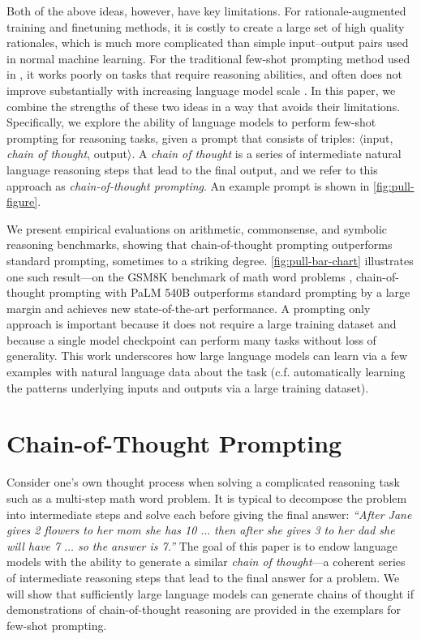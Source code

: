 Both of the above ideas, however, have key limitations. For rationale-augmented training and finetuning methods, it is costly to create a large set of high quality rationales, which is much more complicated than simple input--output pairs used in normal machine learning. For the traditional few-shot prompting method used in \citet{brown2020language}, it works poorly on tasks that require reasoning abilities, and often does not improve substantially with increasing language model scale \citep{rae2021scaling}. In this paper, we combine the strengths of these two ideas in a way that avoids their limitations. Specifically, we explore the ability of language models to perform few-shot prompting for reasoning tasks, given a prompt that consists of triples: $\langle$input, \emph{chain of thought}, output$\rangle$.
A \emph{chain of thought} is a series of intermediate natural language reasoning steps that lead to the final output, and we refer to this approach as \textit{chain-of-thought prompting}. An example prompt is shown in \cref{fig:pull-figure}. 

We present empirical evaluations on arithmetic, commonsense, and symbolic reasoning benchmarks, showing that chain-of-thought prompting outperforms standard prompting, sometimes to a striking degree.
\cref{fig:pull-bar-chart} illustrates one such result---on the GSM8K benchmark of math word problems \citep{cobbe2021training}, chain-of-thought prompting with PaLM 540B outperforms standard prompting by a large margin and achieves new state-of-the-art performance. A prompting only approach is important because it does not require a large training dataset and because a single model checkpoint can perform many tasks without loss of generality. This work underscores how large language models can learn via a few examples with natural language data about the task (c.f. automatically learning the patterns underlying inputs and outputs via a large training dataset).

\section{Chain-of-Thought Prompting} Consider one's own thought process when solving a complicated reasoning task such as a multi-step math word problem. It is typical to decompose the problem into intermediate steps and solve each before giving the final answer: \textit{``After Jane gives 2 flowers to her mom she has 10 $\ldots$ then after she gives 3 to her dad she will have 7 $\ldots$ so the answer is 7.''} The goal of this paper is to endow language models with the ability to generate a similar \textit{chain of thought}---a coherent series of intermediate reasoning steps that lead to the final answer for a problem. We will show that sufficiently large language models can generate chains of thought if demonstrations of chain-of-thought reasoning are provided in the exemplars for few-shot prompting.

